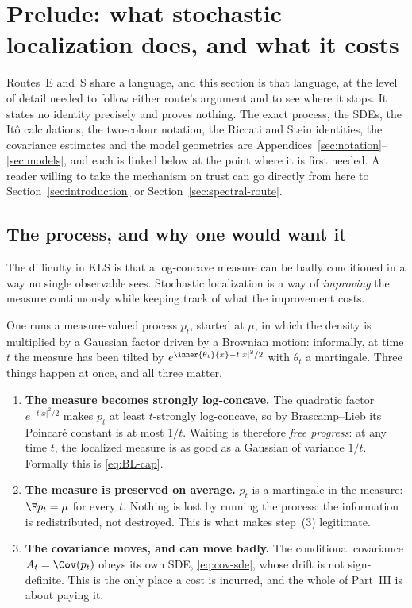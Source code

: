 \documentclass[../../main.tex]{subfiles}
\begin{document}
\section{Prelude: what stochastic localization does, and what it costs}
\label{sec:localization-prelude}

Routes~E and~S share a language, and this section is that language, at the level of detail
needed to follow either route's argument and to see where it stops. It states no identity
precisely and proves nothing. The exact process, the SDEs, the It\^o calculations, the
two-colour notation, the Riccati and Stein identities, the covariance estimates and the model
geometries are Appendices~\ref{sec:notation}--\ref{sec:models}, and each is linked below at the
point where it is first needed. A reader willing to take the mechanism on trust can go directly
from here to Section~\ref{sec:introduction} or Section~\ref{sec:spectral-route}.

\subsection{The process, and why one would want it}
\label{subsec:prelude-process}

The difficulty in KLS is that a log-concave measure can be badly conditioned in a way no single
observable sees. Stochastic localization is a way of \emph{improving} the measure continuously
while keeping track of what the improvement costs.

One runs a measure-valued process $p_t$, started at $\mu$, in which the density is multiplied by a
Gaussian factor driven by a Brownian motion: informally, at time $t$ the measure has been tilted
by $e^{\inner{\theta_t}{x}-t|x|^2/2}$ with $\theta_t$ a martingale. Three things happen at once,
and all three matter.

\begin{enumerate}[label=(\arabic*),leftmargin=2.4em]
  \item \textbf{The measure becomes strongly log-concave.} The quadratic factor $e^{-t|x|^2/2}$
  makes $p_t$ at least $t$-strongly log-concave, so by Brascamp--Lieb its Poincar\'e constant is at
  most $1/t$. Waiting is therefore \emph{free progress}: at any time $t$, the localized measure is
  as good as a Gaussian of variance $1/t$. Formally this is \eqref{eq:BL-cap}.
  \item \textbf{The measure is preserved on average.} $p_t$ is a martingale in the measure: $\E
  p_t=\mu$ for every $t$. Nothing is lost by running the process; the information is redistributed,
  not destroyed. This is what makes step~(3) legitimate.
  \item \textbf{The covariance moves, and can move badly.} The conditional covariance
  $A_t=\Cov(p_t)$ obeys its own SDE, \eqref{eq:cov-sde}, whose drift is not sign-definite. This is
  the only place a cost is incurred, and the whole of Part~III is about paying it.
\end{enumerate}
\end{document}
